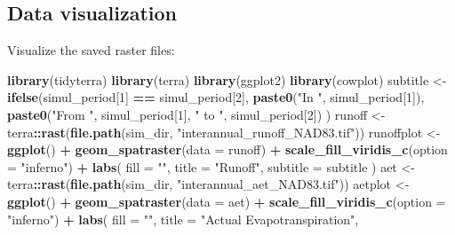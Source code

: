 \documentclass[
]{book}
\newenvironment{Shaded}{\begin{snugshade}}{\end{snugshade}}
\newcommand{\AttributeTok}[1]{\textcolor[rgb]{0.13,0.29,0.53}{#1}}
\newcommand{\DecValTok}[1]{\textcolor[rgb]{0.00,0.00,0.81}{#1}}
\newcommand{\FunctionTok}[1]{\textcolor[rgb]{0.13,0.29,0.53}{\textbf{#1}}}
\newcommand{\NormalTok}[1]{#1}
\newcommand{\OtherTok}[1]{\textcolor[rgb]{0.56,0.35,0.01}{#1}}
\newcommand{\SpecialCharTok}[1]{\textcolor[rgb]{0.81,0.36,0.00}{\textbf{#1}}}
\newcommand{\StringTok}[1]{\textcolor[rgb]{0.31,0.60,0.02}{#1}}
\begin{document}
\hypertarget{data-visualization}{%
\subsection{Data visualization}\label{data-visualization}}

Visualize the saved raster files:

\begin{Shaded}
\begin{Highlighting}[]
\FunctionTok{library}\NormalTok{(tidyterra)}
\FunctionTok{library}\NormalTok{(terra)}
\FunctionTok{library}\NormalTok{(ggplot2)}
\FunctionTok{library}\NormalTok{(cowplot)}
\NormalTok{subtitle }\OtherTok{\textless{}{-}} \FunctionTok{ifelse}\NormalTok{(simul\_period[}\DecValTok{1}\NormalTok{] }\SpecialCharTok{==}\NormalTok{ simul\_period[}\DecValTok{2}\NormalTok{],}
  \FunctionTok{paste0}\NormalTok{(}\StringTok{"In "}\NormalTok{, simul\_period[}\DecValTok{1}\NormalTok{]),}
  \FunctionTok{paste0}\NormalTok{(}\StringTok{"From "}\NormalTok{, simul\_period[}\DecValTok{1}\NormalTok{], }\StringTok{" to "}\NormalTok{, simul\_period[}\DecValTok{2}\NormalTok{])}
\NormalTok{)}
\NormalTok{runoff }\OtherTok{\textless{}{-}}\NormalTok{ terra}\SpecialCharTok{::}\FunctionTok{rast}\NormalTok{(}\FunctionTok{file.path}\NormalTok{(sim\_dir, }\StringTok{"interannual\_runoff\_NAD83.tif"}\NormalTok{))}
\NormalTok{runoffplot }\OtherTok{\textless{}{-}} \FunctionTok{ggplot}\NormalTok{() }\SpecialCharTok{+}
  \FunctionTok{geom\_spatraster}\NormalTok{(}\AttributeTok{data =}\NormalTok{ runoff) }\SpecialCharTok{+}
  \FunctionTok{scale\_fill\_viridis\_c}\NormalTok{(}\AttributeTok{option =} \StringTok{"inferno"}\NormalTok{) }\SpecialCharTok{+}
  \FunctionTok{labs}\NormalTok{(}
    \AttributeTok{fill =} \StringTok{""}\NormalTok{,}
    \AttributeTok{title =} \StringTok{"Runoff"}\NormalTok{,}
    \AttributeTok{subtitle =}\NormalTok{ subtitle}
\NormalTok{  )}
\NormalTok{aet }\OtherTok{\textless{}{-}}\NormalTok{ terra}\SpecialCharTok{::}\FunctionTok{rast}\NormalTok{(}\FunctionTok{file.path}\NormalTok{(sim\_dir, }\StringTok{"interannual\_aet\_NAD83.tif"}\NormalTok{))}
\NormalTok{aetplot }\OtherTok{\textless{}{-}} \FunctionTok{ggplot}\NormalTok{() }\SpecialCharTok{+}
  \FunctionTok{geom\_spatraster}\NormalTok{(}\AttributeTok{data =}\NormalTok{ aet) }\SpecialCharTok{+}
  \FunctionTok{scale\_fill\_viridis\_c}\NormalTok{(}\AttributeTok{option =} \StringTok{"inferno"}\NormalTok{) }\SpecialCharTok{+}
  \FunctionTok{labs}\NormalTok{(}
    \AttributeTok{fill =} \StringTok{""}\NormalTok{,}
    \AttributeTok{title =} \StringTok{"Actual Evapotranspiration"}\NormalTok{,}

\end{Highlighting}
\end{Shaded}
\end{document}
